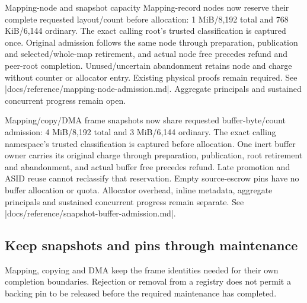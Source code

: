 \begin{implementationdetail}{Mapping-node and snapshot capacity}
Mapping-record nodes now reserve their complete requested layout/count before
allocation: 1 MiB/8,192 total and 768 KiB/6,144 ordinary. The exact calling root's
trusted classification is captured once. Original admission follows the same node
through preparation, publication and selected/whole-map retirement, and actual node
free precedes refund and peer-root completion. Unused/uncertain abandonment
retains node and charge without counter or allocator entry. Existing physical
proofs remain required. See \repofile|docs/reference/mapping-node-admission.md|.
Aggregate principals and sustained concurrent progress remain open.

Mapping/copy/DMA frame snapshots now share requested buffer-byte/count admission:
4 MiB/8,192 total and 3 MiB/6,144 ordinary. The exact calling namespace's trusted
classification is captured before allocation. One inert buffer owner carries its
original charge through preparation, publication, root retirement and abandonment, and
actual buffer free precedes refund. Late promotion and ASID reuse cannot reclassify
that reservation. Empty source-escrow pins have no buffer allocation or quota.
Allocator overhead, inline metadata, aggregate principals and sustained concurrent
progress remain separate. See \repofile|docs/reference/snapshot-buffer-admission.md|.
\end{implementationdetail}

\subsection{Keep snapshots and pins through maintenance}

Mapping, copying and DMA keep the frame identities needed for their own
completion boundaries. Rejection or removal from a registry does not permit a
backing pin to be released before the required maintenance has completed.

